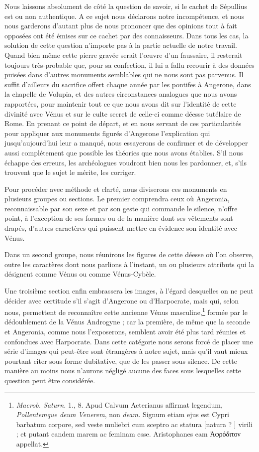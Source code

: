 \documentclass[a4paper, 11pt, oneside, polutonikogreek, french]{article}
\begin{document}
Nous laissons absolument de côté la question de savoir, si le cachet de Sépullius est ou non authentique. A ce sujet nous déclarons notre incompétence, et nous nous garderons d'autant plus de nous prononcer que des opinions tout à fait opposées ont été émises sur ce cachet par des connaisseurs. Dans tous les cas, la solution de cette question n'importe pas à la partie actuelle de notre travail. Quand bien même cette pierre gravée serait l'œuvre d'un faussaire, il resterait toujours très-probable que, pour sa confection, il lui a fallu recourir à des données puisées dans d'autres monuments semblables qui ne nous sont pas parvenus. Il suffit d'ailleurs du sacrifice offert chaque année par les pontifes à Angerone, dans la chapelle de Volupia, et des autres circonstances analogues que nous avons rapportées, pour maintenir tout ce que nous avons dit sur l'identité de cette divinité avec Vénus et sur le culte secret de celle-ci comme déesse tutélaire de Rome. En prenant ce point de départ, et en nous servant de ces particularités pour appliquer aux monuments figurés d'Angerone l'explication qui jusqu'aujourd'hui leur a manqué, nous essayerons de confirmer et de développer aussi complétement que possible les théories que nous avons établies. S'il nous échappe des erreurs, les archéologues voudront bien nous les pardonner, et, s'ils trouvent que le sujet le mérite, les corriger.

Pour procéder avec méthode et clarté, nous diviserons ces monuments en plusieurs groupes ou sections. Le premier comprendra ceux où Angeronia, reconnaissable par son sexe et par son geste qui commande le silence, n'offre point, à l'exception de ses formes ou de la manière dont ses vêtements sont drapés, d'autres caractères qui puissent mettre en évidence son identité avec Vénus.

Dans un second groupe, nous réunirons les figures de cette déesse où l'on observe, outre les caractères dont nous parlions à l'instant, un ou plusieurs attributs qui la désignent comme Vénus ou comme Vénus-Cybèle.

Une troisième section enfin embrassera les images, à l'égard desquelles on ne peut décider avec certitude s'il s'agit d'Angerone ou d'Harpocrate, mais qui, selon nous, permettent de reconnaître cette ancienne Vénus masculine,\footnote{\emph{Macrob. Saturn.} 1., 8. Apud Calvum Acterianus affirmat legendum, \emph{Pollentemque deum Venerem}, non \emph{deam.} Signum etiam ejus est Cypri barbatum corpore, sed veste muliebri cum sceptro ac statura [natura ? ] virili ; et putant eandem marem ac feminam esse. Aristophanes eam Ἀφρόδιτον appellat.} formée par le dédoublement de la Vénus Androgyne ; car la première, de même que la seconde et Angeronia, comme nous l'exposerons, semblent avoir été plus tard réunies et confondues avec Harpocrate. Dans cette catégorie nous serons forcé de placer une série d'images qui peut-être sont étrangères à notre sujet, mais qu'il vaut mieux pourtant citer sous forme dubitative, que de les passer sous silence. De cette manière au moins nous n'aurons négligé aucune des faces sous lesquelles cette question peut être considérée.
\end{document}
